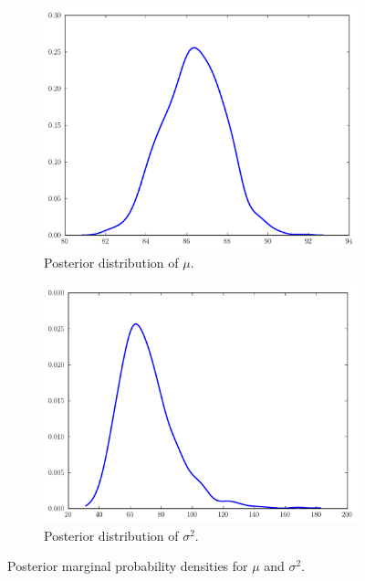 \begin{figure}
	\begin{subfigure}[b]{.49\textwidth}
		\includegraphics[width=\textwidth]{mu_posterior.pdf}
		\caption{Posterior distribution of $\mu$.}
	\end{subfigure}
	\begin{subfigure}[b]{.49\textwidth}
		\includegraphics[width=\textwidth]{sigma2_posterior.pdf}
		\caption{Posterior distribution of $\sigma^2$.}
	\end{subfigure}
\caption{Posterior marginal probability densities for $\mu$ and $\sigma^2$.}
\label{fig:post}
\end{figure}

